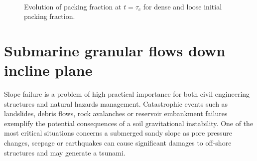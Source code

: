 \begin{figure}
\centering
{}\\
\caption{Evolution of packing fraction at $t = \tau_c$ for dense and loose 
initial packing fraction.}
\label{fig:Dense_Loose_voro}
\end{figure}

\clearpage


\section{Submarine granular flows down incline plane}

Slope failure is a problem of high practical importance for both civil 
engineering structures and natural hazards management. Catastrophic events such 
as landslides, debris flows, rock avalanches or reservoir embankment failures 
exemplify the potential consequences of a soil gravitational instability. One 
of the most critical situations concerns a submerged sandy slope as pore 
pressure changes, seepage or earthquakes can cause significant damages to 
off-shore structures and may generate a tsunami.

